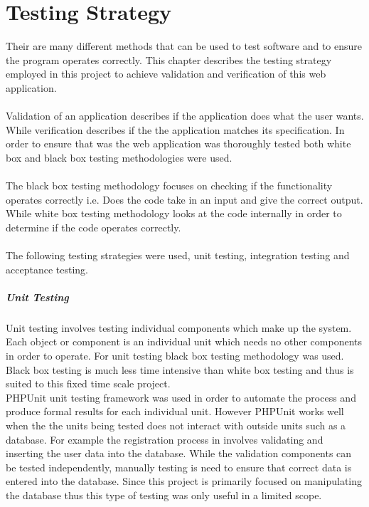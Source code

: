 \documentclass[a4paper,oneside,11pt]{report}
\begin{document}
\section{Testing Strategy}
Their are many different methods that can be used to test software and to ensure the program operates correctly. This chapter describes the testing strategy employed in this project to achieve validation and verification of this web application.
\\
\\
Validation of an application describes if the application does what the user wants. While verification describes if the the application matches its specification. In order to ensure that was the web application was thoroughly tested both white box and black box testing methodologies were used.
\\
\\
The black box testing methodology focuses on checking if the functionality operates correctly i.e. Does the code take in an input and give the correct output. While white box testing methodology looks at the code internally in order to determine if the code operates correctly.
\\
\\
The following testing strategies were used, unit testing, integration testing and acceptance testing.
\subparagraph{Unit Testing}
Unit testing involves testing individual components which make up the system. Each object or component is an individual unit which needs no other components in order to operate. For unit testing black box testing methodology was used. Black box testing is much less time intensive than white box testing and thus is suited to this fixed time scale project.
\\
PHPUnit unit testing framework was used in order to automate the process and produce formal results for each individual unit. However PHPUnit works well when the the units being tested does not interact with outside units such as a database. For example the registration process in involves validating and inserting the user data into the database. While the validation components can be tested independently, manually testing is need to ensure that correct data is entered into the database. Since this project is primarily focused on manipulating the database thus this type of testing was only useful in a limited scope.
\end{document}
